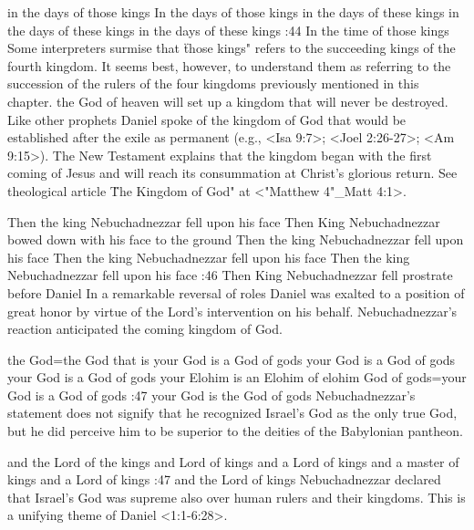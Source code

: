     {in the days of those kings} %
    {In the days of those kings} %
    {in the days of these kings} %
    {in the days of these kings} %
    {in the days of these kings} %
:44 {In the time of those kings} Some interpreters surmise that 
 \"those kings" refers to the succeeding kings of the fourth kingdom. 
It seems best, however, to understand them as referring to the succession of the rulers of the four
kingdoms previously mentioned in  
this chapter. the God of heaven will set up a kingdom that will 
never be destroyed. Like other prophets Daniel spoke of the 
kingdom of God that would be established after the exile as permanent (e.g., <Isa 9:7>; <Joel 2:26-27>;
<Am 9:15>). The New Testament  
explains that the kingdom began with the first coming of Jesus and 
will reach its consummation at Christ's glorious return. See theological article \"The Kingdom of
God" at <"Matthew 4"_Matt 4:1>. 

    {Then the king Nebuchadnezzar fell upon his face} %
    {Then King Nebuchadnezzar bowed down with his face to the ground} %
    {Then the king Nebuchadnezzar fell upon his face} %
    {Then the king Nebuchadnezzar fell upon his face} %
    {Then the king Nebuchadnezzar fell upon his face} %
:46 {Then King Nebuchadnezzar fell prostrate before Daniel} In a remarkable reversal of roles Daniel
was exalted to a position of great honor by virtue of the Lord's intervention on his
behalf. Nebuchadnezzar's reaction anticipated the coming kingdom  of God.

    {the God}={the God that is your God is a God of gods} %
    {your God is a God of gods} %
    {your God is a God of gods} %
    {your Elohim is an Elohim of elohim} %
    {God of gods}={your God is a God of gods} %
:47 {your God is the God of gods} Nebuchadnezzar's statement 
does not signify that he recognized Israel's God as the only true
God, but he did perceive him to be superior to the deities of the 
Babylonian pantheon. 

    {and the Lord of the kings} %
    {and Lord of kings} %
    {and a Lord of kings} %
    {and a master of kings} %
    {and a Lord of kings} %
:47 {and the Lord of kings}
Nebuchadnezzar 
declared that Israel's God was supreme also over human rulers and 
their kingdoms. This is a unifying theme of Daniel <1:1-6:28>.


